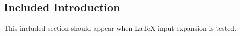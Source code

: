 \subsection{Included Introduction}
This included section should appear when LaTeX input expansion is tested.
